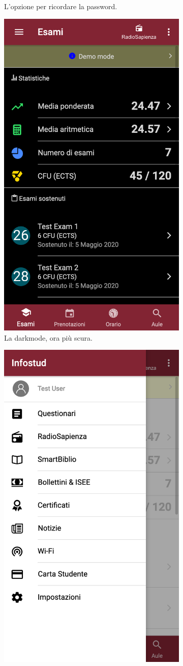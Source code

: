 \documentclass[Lau, oneside, noexaminfo]{sapthesis}%
\begin{document}
\begin{figure}[H]
\begin{subfigure}{0.6\textwidth}
		\caption{L'opzione per ricordare la password.}
	\end{subfigure}
	\begin{subfigure}{0.6\textwidth}
		\label{subfig:3}
		\centering
		\includegraphics[width=0.5\linewidth]{issues/darkmode}  
		\caption{La darkmode, ora più scura.}
	\end{subfigure}
	\begin{subfigure}{0.6\textwidth}
		\label{subfig:4}
		\centering
		\includegraphics[width=0.5\linewidth]{issues/propic-1}

\end{subfigure}
\end{figure}
\end{document}
